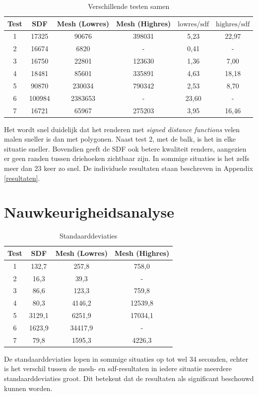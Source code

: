 \documentclass[12pt, a4paper]{article}
\begin{document}
\begin{table}[H]
\centering
\begin{tabular}{| c | c c c || c c |}
	\hline
	Test & SDF & Mesh (Lowres) & Mesh (Highres) & $\text{lowres}/\text{sdf}$ & $\text{highres}/\text{sdf}$ \\
	\hline
	1 & 17325 & 90676 & 398031 & 5,23 & 22,97 \\
	2 & 16674 & 6820 & - & 0,41 & - \\
	3 & 16750 & 22801 & 123630 & 1,36 & 7,00 \\
	4 & 18481 & 85601 & 335891 & 4,63 & 18,18 \\
	5 & 90870 & 230034 & 790342 & 2,53 & 8,70 \\
	6 & 100984 & 2383653 & - & 23,60 & - \\
	7 & 16721 & 65967 & 275203 & 3,95 & 16,46 \\
	\hline
\end{tabular}
\caption{Verschillende testen samen}
\end{table}

Het wordt snel duidelijk dat het renderen met \textit{signed distance functions} velen malen sneller is dan met polygonen. Naast test 2, met de balk, is het in elke situatie sneller. Bovendien geeft de SDF ook betere kwaliteit renders, aangezien er geen randen tussen driehoeken zichtbaar zijn. In sommige situaties is het zelfs meer dan 23 keer zo snel. De individuele resultaten staan beschreven in Appendix \ref{resultaten}.
\section{Nauwkeurigheidsanalyse}
\begin{table}[H]
	\centering
	\begin{tabular}{| c | c c c |}
		\hline
		Test & SDF & Mesh (Lowres) & Mesh (Highres) \\
		\hline
		1 & 132,7 & 257,8 & 758,0\\
		2 & 16,3 & 39,3 & - \\
		3 & 86,6 & 123,3 & 759,8  \\
		4 & 80,3 & 4146,2 & 12539,8 \\
		5 & 3129,1 & 6251,9 & 17034,1 \\
		6 & 1623,9 & 34417,9 & - \\
		7 & 79,8 & 1595,3 & 4226,3 \\
		\hline
	\end{tabular}
	\caption{Standaarddeviaties}
\end{table}
De standaarddeviaties lopen in sommige situaties op tot wel 34 seconden, echter is het verschil tussen de mesh- en sdf-resultaten in iedere situatie meerdere standaarddeviaties groot. Dit betekent dat de resultaten als significant beschouwd kunnen worden. 
\end{document}
